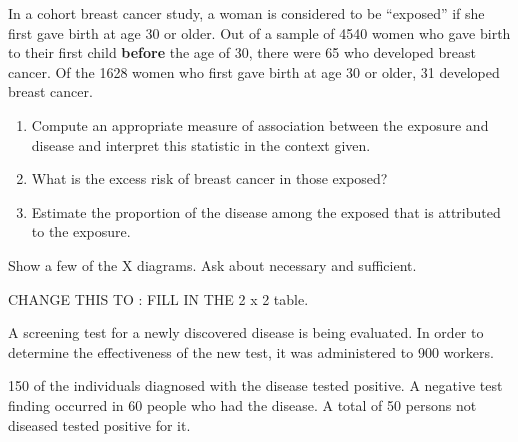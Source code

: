 In a cohort breast cancer study, a woman is considered to be ``exposed'' if she first gave birth at age 30 or older.  Out of a sample of 4540 women who gave birth to their first child {\bf before} the age of 30, there were 65 who developed breast cancer.  Of the 1628 women who first gave birth at age 30 or older, 31 developed breast cancer.

\begin{enumerate}
\item Compute an appropriate measure of association between the exposure and disease and interpret this statistic in the context given.
\item What is the excess risk of breast cancer in those exposed?
\item Estimate the proportion of the disease among the exposed that is attributed to the exposure.
\end{enumerate}

Show a few of the X diagrams.  Ask about necessary and sufficient.


CHANGE THIS TO : FILL IN THE 2 x 2 table.

A screening test for a newly discovered disease is being evaluated.  In order to determine the effectiveness of the new test, it was administered to 900 workers.

150 of the individuals diagnosed with the disease tested positive.  A negative test finding occurred in 60 people who had the disease.  A total of 50 persons not diseased tested positive for it.

